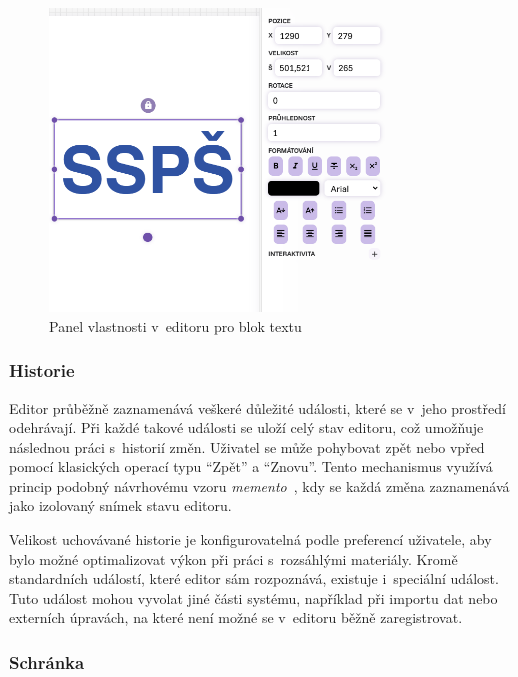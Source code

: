 \begin{figure}[ht!]
    \centering
    \includegraphics[width=0.8\textwidth]{media/05_realizace/vlastnosti.png}
    \caption{Panel vlastnosti v~editoru pro blok textu}
    \label{fig:realizace/vlastnosti}
\end{figure}

\subsubsection{Historie}

Editor průběžně zaznamenává veškeré důležité události, které se v~jeho prostředí odehrávají. 
Při každé takové události se uloží celý stav editoru, což umožňuje následnou práci s~historií změn. 
Uživatel se může pohybovat zpět nebo vpřed pomocí klasických operací typu \enquote{Zpět} a \enquote{Znovu}. Tento mechanismus využívá princip podobný návrhovému vzoru \emph{memento}~\cite{kerievsky_2004}, kdy se každá změna zaznamenává jako izolovaný snímek stavu editoru.

Velikost uchovávané historie je konfigurovatelná podle preferencí uživatele, aby bylo možné optimalizovat výkon při práci s~rozsáhlými materiály. 
Kromě standardních událostí, které editor sám rozpoznává, existuje i~speciální událost.
Tuto událost mohou vyvolat jiné části systému, například při importu dat nebo externích úpravách, na které není možné se v~editoru běžně zaregistrovat.

\subsubsection{Schránka}

